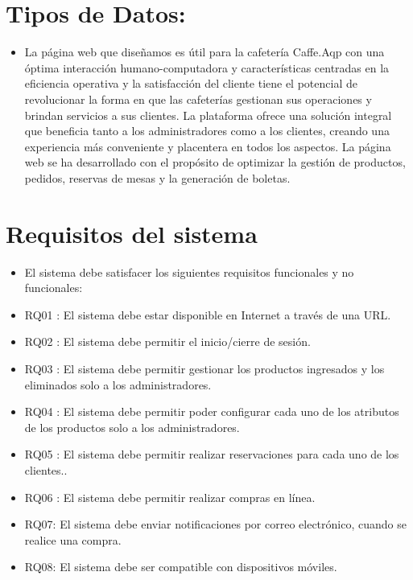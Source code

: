\documentclass{article}
\begin{document}
	\section{Tipos de Datos:}
	\begin{itemize}		
		\item La página web que diseñamos es útil para la cafetería Caffe.Aqp con una óptima interacción humano-computadora y características centradas en la eficiencia operativa y la satisfacción del cliente tiene el potencial de revolucionar la forma en que las cafeterías gestionan sus operaciones y brindan servicios a sus clientes. La plataforma ofrece una solución integral que beneficia tanto a los administradores como a los clientes, creando una experiencia más conveniente y placentera en todos los aspectos. La página web se ha desarrollado con el propósito de optimizar la gestión de productos, pedidos, reservas de mesas y la generación de boletas.
	\end{itemize}
		
	\section{Requisitos del sistema}
	\begin{itemize}
		\item El sistema debe satisfacer los siguientes requisitos funcionales y no funcionales:
		\item RQ01 : El sistema debe estar disponible en Internet a través de una URL.
		\item RQ02 : El sistema debe permitir el inicio/cierre de sesión.
		\item RQ03 : El sistema debe permitir gestionar los productos ingresados y los eliminados solo a los administradores.
		\item RQ04 : El sistema debe permitir poder configurar cada uno de los atributos de los productos solo a los administradores.
		\item RQ05 : El sistema debe permitir realizar reservaciones para cada uno de los clientes..
		\item RQ06 : El sistema debe permitir realizar compras en línea.
  	\item RQ07: El sistema debe enviar 
        notificaciones por correo electrónico, cuando se realice una compra.
		\item RQ08: El sistema debe ser compatible con dispositivos móviles.
	\end{itemize}
	
\end{document}
